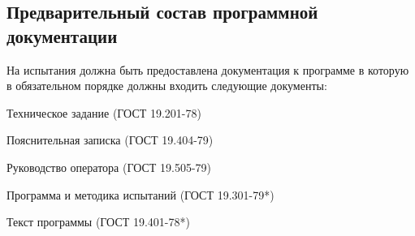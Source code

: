 \subsection{Предварительный состав программной документации}
На испытания должна быть предоставлена документация к программе в которую в обязательном порядке должны входить следующие документы:
\begin{my_enumerate}
\item Техническое задание  (ГОСТ 19.201-78)
\item Пояснительная записка  (ГОСТ 19.404-79)
\item Руководство оператора  (ГОСТ 19.505-79)
\item Программа и методика испытаний (ГОСТ 19.301-79*)
\item Текст программы  (ГОСТ 19.401-78*)
\end{my_enumerate}

